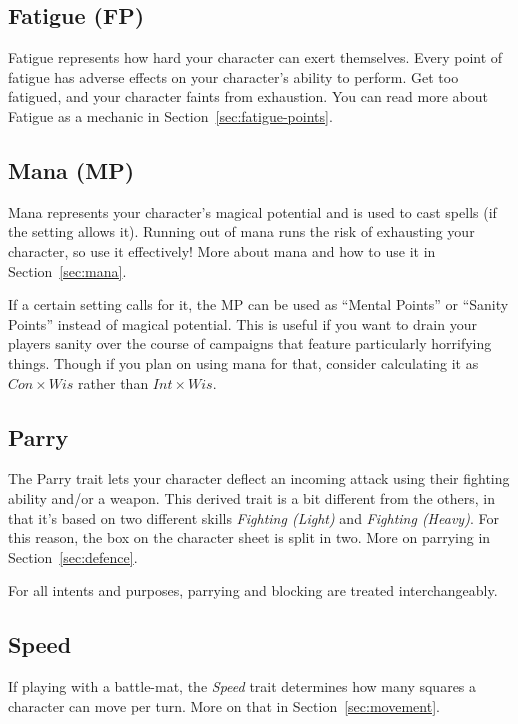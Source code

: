 \subsection{Fatigue (FP)}
Fatigue represents how hard your character can exert themselves.
Every point of fatigue has adverse effects on your character's ability to perform.
Get too fatigued, and your character faints from exhaustion.
You can read more about Fatigue as a mechanic in Section~\ref{sec:fatigue-points}.

\subsection{Mana (MP)}
Mana represents your character's magical potential and is used to cast spells (if the setting allows it).
Running out of mana runs the risk of exhausting your character, so use it effectively!
More about mana and how to use it in Section~\ref{sec:mana}.

\begin{note} 
    If a certain setting calls for it, the MP can be used as ``Mental Points'' or ``Sanity Points'' instead of magical potential.
    This is useful if you want to drain your players sanity over the course of campaigns that feature particularly horrifying things.
    Though if you plan on using mana for that, consider calculating it as $Con \times Wis$ rather than $Int \times Wis$.
\end{note}

\subsection{Parry}
The Parry trait lets your character deflect an incoming attack using their fighting ability and/or a weapon.
This derived trait is a bit different from the others, in that it's based on two different skills \textit{Fighting (Light)} and \textit{Fighting (Heavy)}.
For this reason, the box on the character sheet is split in two.
More on parrying in Section~\ref{sec:defence}.

\begin{note} 
    For all intents and purposes, parrying and blocking are treated interchangeably.
\end{note}

\subsection{Speed}
If playing with a battle-mat, the \textit{Speed} trait determines how many squares a character can move per turn.
More on that in Section~\ref{sec:movement}.

